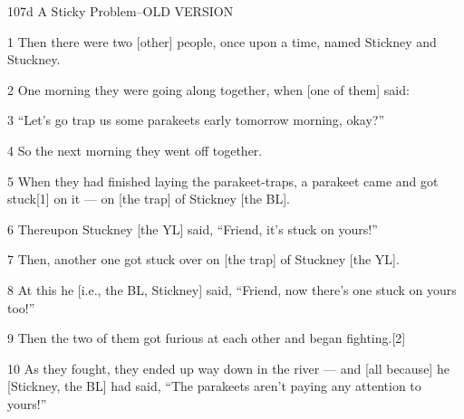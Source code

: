 
{\LARGE{}107d A Sticky Problem--OLD VERSION}

{\LARGE{}1 Then there were two [other] people, once upon a time, named Stickney
and Stuckney.}

{\LARGE{}2 One morning they were going along together, when [one of them] said:}

{\LARGE{}3 ``Let's go trap us some parakeets early tomorrow morning, okay?''}

{\LARGE{}4 So the next morning they went off together.}

{\LARGE{}5 When they had finished laying the parakeet-traps, a parakeet came and
got stuck[1] on it --- on [the trap] of Stickney [the BL].}

{\LARGE{}6 Thereupon Stuckney [the YL] said, ``Friend, it's stuck on yours!''}

{\LARGE{}7 Then, another one got stuck over on [the trap] of Stuckney [the YL].}

{\LARGE{}8 At this he [i.e., the BL, Stickney] said, ``Friend, now there's one
stuck on yours too!''}

{\LARGE{}9 Then the two of them got furious at each other and began fighting.[2]}

{\LARGE{}10 As they fought, they ended up way down in the river --- and [all because]
he [Stickney, the BL] had said, ``The parakeets aren't paying any attention to
yours!''}

